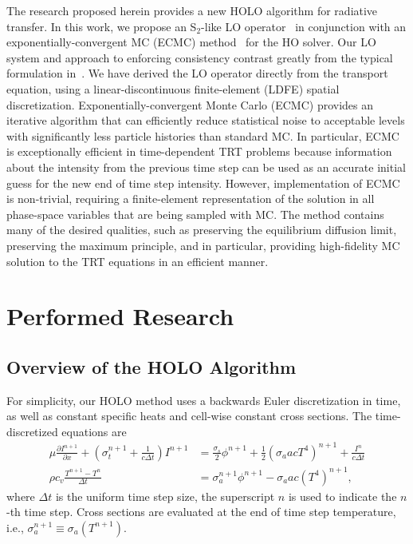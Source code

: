 \documentclass[11pt]{article}
\newcommand{\pderiv}[2]{\frac{\partial #1}{\partial #2}}
\begin{document}
The research proposed herein provides a new HOLO algorithm for radiative transfer.
In this work, we propose an S$_2$-like LO operator~\cite{wolters}
in conjunction with an exponentially-convergent MC (ECMC) method~\cite{jake} for the
HO solver. Our LO system and approach to enforcing consistency contrast greatly from the typical formulation
in~\cite{rmc,willert,park}. We have derived the LO operator directly from the transport
equation, using a linear-discontinuous finite-element (LDFE) spatial
discretization.   
Exponentially-convergent Monte Carlo (ECMC)\cite{jake,ans_2014} provides an iterative algorithm that can efficiently
reduce statistical noise to acceptable levels with
significantly less particle histories than standard MC. In particular, ECMC is
exceptionally efficient in time-dependent TRT problems because information about the
intensity from the previous time step can be used as an accurate initial guess for
the new end of time step intensity.   However, implementation
of ECMC is non-trivial, requiring a finite-element representation of the solution in
all phase-space variables that are being sampled with MC.  
The method contains many of the desired qualities, such as
preserving the equilibrium diffusion limit, preserving the maximum principle, and in
particular, providing high-fidelity MC solution to the TRT equations in an efficient
manner.


\section{Performed Research}
\label{sec:perf}

\subsection{Overview of the HOLO Algorithm}

For simplicity, our HOLO method uses a backwards Euler discretization in time, as
well as constant specific heats and cell-wise constant cross sections. The time-discretized
equations are
\begin{align}
    \mu \pderiv{I^{n+1}}{x} + \left(\sigma_t^{n+1} + \frac{1}{c \Delta t }\right) I^{n+1}
&= \frac{\sigma_s}{2} \phi^{n+1} +\frac{1}{2} \left(\sigma_a a c T^4 \right)^{n+1} + \frac{I^n}{c \Delta t} \label{ho_trans} \\
\rho c_v \frac{T^{n+1} - T^n}{\Delta t} &= \sigma_a^{n+1} \phi^{n+1}
- \sigma_a a c (T^4)^{n+1} \label{lo_mat},
\end{align}
where $\Delta t$ is the uniform time step size, the superscript $n$ is used to indicate
the $n$-th time step. Cross sections are evaluated at the end of time step
temperature, i.e., $\sigma_a^{n+1}\equiv\sigma_a(T^{n+1})$.   
\end{document}
